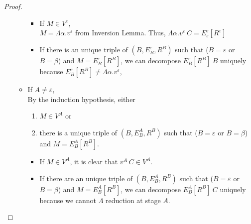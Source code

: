 \begin{proof}
\begin{itemize}
\begin{itemize}
		      	      \begin{itemize}
		      	      	\item If $ M \in V^\varepsilon$,\\
		      	      	    $ M = \Lambda\alpha.v^\varepsilon$ from Inversion Lemma.
		      	      	    Thus, $ \Lambda\alpha.v^\varepsilon\ C = E^\varepsilon_\varepsilon [R^\varepsilon]$
		      	      	\item If there is an unique triple of $(B, E^\varepsilon_B, R^B)$ such that ($B = \varepsilon$ or $B = \beta$) and $M = E^\varepsilon_B[R^B]$,
		      	      		we can decompose $E^\varepsilon_B[R^B]\ B$ uniquely
		      	      	    because $ E^\varepsilon_B[R^B] \neq \Lambda\alpha.v^\varepsilon$, 
		      	      \end{itemize}
		      	      		      	      	      	      	      	      	      	      	      	      	      	      	      	      	      	      	      	      	      	      	      	      	      	      		      	      	      	      	      	      	      	      
		      	\item If $ A \neq \varepsilon $,\\
		      	      By the induction hypothesis, either
		      	      \begin{enumerate}
		      	      	\item $ M \in V^A$ or
		      	      	\item there is a unique triple of $(B, E^A_B, R^B)$ such that ($B = \varepsilon$ or $B = \beta$) and $M = E^A_B[R^B]$.
		      	      \end{enumerate}
		      	      \begin{itemize}
		      	      	\item If $ M \in V^A$,
		      	      	    it is clear that $v^A\ C \in V^A$.
		      	      	\item If there are an unique triple of $(B, E^A_B, R^B)$ such that ($B = \varepsilon$ or $B = \beta$) and $M = E^A_B[R^B]$,
		      	      	    we can decompose $E^A_B[R^B]\ C$ uniquely because we cannot $\Lambda$ reduction at stage $A$.
		      	      \end{itemize}
		      \end{itemize}
		      		      	      	      	      	      	      	      	      	      	      	      	      		      	      	      	      
		      		      	      	      	      	      	      	      	      	      	      	      	      		      	      	      	      

\end{itemize}
\end{proof}
